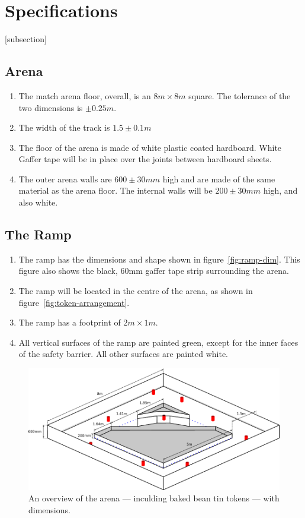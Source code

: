 \section{Specifications}
[subsection]
\newcommand{\rcnii}{\stepcounter{rulei}\arabic{section}.\arabic{subsection}.\arabic{rulei}}
\renewcommand{\labelenumi}{\rcnii}

\subsection{Arena}
\begin{enumerate}
\item The match arena floor, overall, is an $8m \times 8m$ square.
 The tolerance of the two dimensions is $\pm0.25m$.
\item The width of the track is $1.5\pm0.1m$
\item The floor of the arena is made of white plastic coated hardboard.
 White Gaffer tape will be in place over the joints between hardboard sheets.
\item The outer arena walls are $600\pm30mm$ high and are made of the same material as the arena floor.
 The internal walls will be $200\pm30mm$ high, and also white.
\end{enumerate}

\subsection{The Ramp}
\label{ramp}
\begin {enumerate} 
\item The ramp has the dimensions and shape shown in figure~\ref{fig:ramp-dim}.  This figure also shows the black, 60mm gaffer tape strip surrounding the arena.
\item The ramp will be located in the centre of the arena, as shown in figure~\ref{fig:token-arrangement}.
\item The ramp has a footprint of $2m \times 1m$.
\item All vertical surfaces of the ramp are painted green, except for the inner faces of the safety barrier.  All other surfaces are painted white.
\end {enumerate}

\begin{figure}
  \includegraphics[keepaspectratio, clip, width=\textwidth]{./images/sr2011-arena.pdf}
  \caption{\label{fig:arena-dim}An overview of the arena --- inculding baked bean tin tokens --- with dimensions.}
\end{figure}


